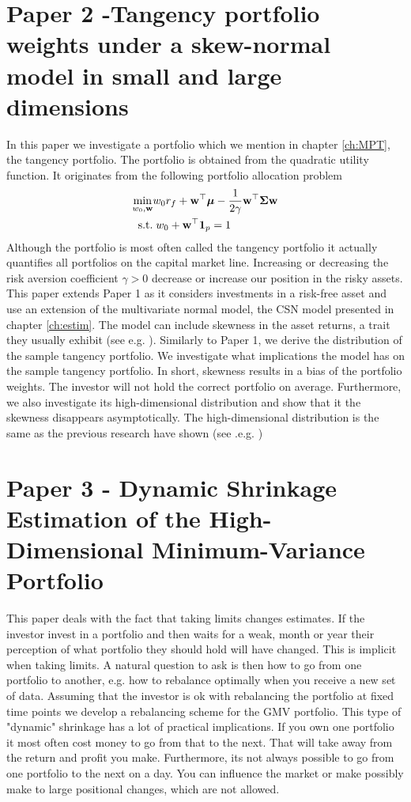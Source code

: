 \documentclass[oneside]{book}\usepackage{knitr}
\begin{document}
\section{Paper 2 -Tangency portfolio weights under a skew-normal model in small and large dimensions}\label{sec:paper2}
In this paper we investigate a portfolio which we mention in chapter \ref{ch:MPT}, the tangency portfolio. 
The portfolio is obtained from the quadratic utility function.
It originates from the following portfolio allocation problem
\begin{align}
  \min_{w_0,\mathbf{w}} & w_0 r_f + \mathbf{w}^\top \mbox{\boldmath$\mu$} - \frac{1}{2\gamma} \mathbf{w}^\top \mathbf{\Sigma} \mathbf{w} \\
  \text{ s.t.} &\; w_0 + \mathbf{w}^\top \mathbf{1}_p = 1
\end{align}
Although the portfolio is most often called the tangency portfolio it actually quantifies all portfolios on the capital market line.
Increasing or decreasing the risk aversion coefficient $\gamma>0$ decrease or increase our position in the risky assets.
This paper extends Paper 1 as it considers investments in a risk-free asset and use an extension of the multivariate normal model, the CSN model presented in chapter \ref{ch:estim}. 
The model can include skewness in the asset returns, a trait they usually exhibit (see e.g. \citet{cont2001empirical}). 
Similarly to Paper 1, we derive the distribution of the sample tangency portfolio.
We investigate what implications the model has on the sample tangency portfolio.
In short, skewness results in a bias of the portfolio weights. 
The investor will not hold the correct portfolio on average.
Furthermore, we also investigate its high-dimensional distribution and show that it the skewness disappears asymptotically. 
The high-dimensional distribution is the same as the previous research have shown (see .e.g. \citet{karlsson2021statistical})

\section{Paper 3 - Dynamic Shrinkage Estimation of the High-Dimensional Minimum-Variance Portfolio}\label{sec:paper3}
This paper deals with the fact that taking limits changes estimates. 
If the investor invest in a portfolio and then waits for a weak, month or year their perception of what portfolio they should hold will have changed. 
This is implicit when taking limits.
A natural question to ask is then how to go from one portfolio to another, e.g. how to rebalance optimally when you receive a new set of data. 
Assuming that the investor is ok with rebalancing the portfolio at fixed time points we develop a rebalancing scheme for the GMV portfolio.
This type of "dynamic" shrinkage has a lot of practical implications.
If you own one portfolio it most often cost money to go from that to the next.
That will take away from the return and profit you make.
Furthermore, its not always possible to go from one portfolio to the next on a day.
You can influence the market or make possibly make to large positional changes, which are not allowed.
\end{document}
